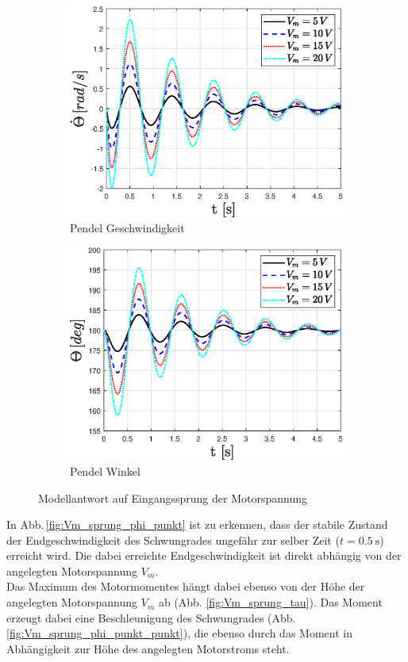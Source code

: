 \begin{figure}
    \begin{subfigure}[b]{0.49\linewidth}
        \includegraphics[width=\linewidth]{Bilder/5_sensi/fig/Vm_sprung/theta_punkt.eps}
        \caption{Pendel Geschwindigkeit}
        \label{fig:Vm_sprung_theta_punkt}      
    \end{subfigure}
    \begin{subfigure}[b]{0.49\linewidth}
        \includegraphics[width=\linewidth]{Bilder/5_sensi/fig/Vm_sprung/theta.eps}
        \caption{Pendel Winkel}
        \label{fig:Vm_sprung_theta}
    \end{subfigure}
        \caption{Modellantwort auf Eingangssprung der Motorspannung}
\end{figure}
In Abb.\,\ref{fig:Vm_sprung_phi_punkt} ist zu erkennen, dass der stabile Zustand der Endgeschwindigkeit des Schwungrades ungefähr zur selber Zeit ($t=\SI{0.5}{\s}$) erreicht wird.
Die dabei erreichte Endgeschwindigkeit ist direkt abhängig von der angelegten Motorspannung $V_m$.\\
Das Maximum des Motormomentes hängt dabei ebenso von der Höhe der angelegten Motorspannung $V_m$ ab (Abb. \ref{fig:Vm_sprung_tau}).
Das Moment erzeugt dabei eine Beschleunigung des Schwungrades (Abb. \ref{fig:Vm_sprung_phi_punkt_punkt}), die ebenso durch das Moment in Abhängigkeit zur Höhe des angelegten Motorstroms steht.


